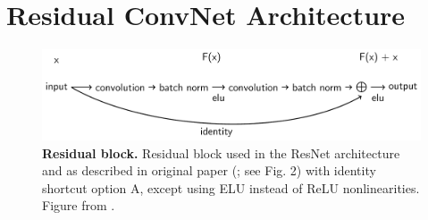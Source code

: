\section{Residual ConvNet
Architecture}\label{residual-convnet-architecture}


\begin{figure}[ht]
    \myfloatalign
    \includegraphics[width=1\linewidth]{images/residual_block.png}
    \caption[Residual block]{
    \textbf{Residual block.} Residual block used in the ResNet architecture
and as described in original paper (\citep{he_deep_2015}; see
Fig. 2) with identity shortcut option A, except using ELU instead of
ReLU nonlinearities. Figure from
\cite{schirrmeisterdeephbm2017}.}
\label{residual-net-figure}
\end{figure}

